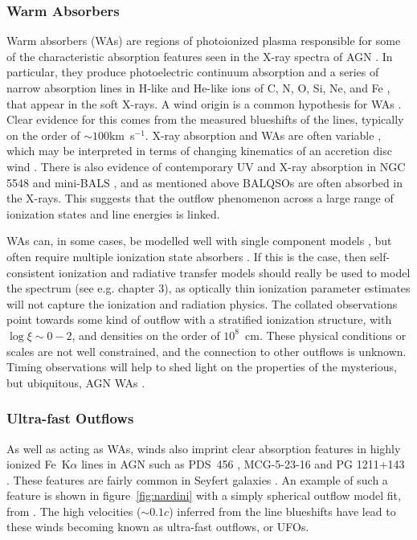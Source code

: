 \subsubsection{Warm Absorbers}

Warm absorbers (WAs) are regions of photoionized plasma responsible for some
of the characteristic absorption features seen in the 
X-ray spectra of AGN \citep{reynolds1995}.
In particular, they produce photoelectric continuum absorption 
\citep[e.g.][]{halpern1984,cappi1996,kriss1996}
and a series of narrow absorption lines in H-like and He-like ions of 
C, N, O, Si, Ne, and Fe \citep{kaastra2000}, that appear in the soft X-rays.
A wind origin is a common hypothesis for WAs 
\citep[e.g.][]{krolikkriss2001}. Clear evidence for this 
comes from the measured blueshifts of the lines, typically on the order of 
$\sim100$km~s$^{-1}$. X-ray absorption and WAs are often
variable \citep{fabian1994,otani1996}, which may be interpreted in terms of 
changing kinematics of an accretion disc wind \citep{connolly2014}. 
There is also evidence of contemporary UV and X-ray absorption 
in NGC 5548 \citep{kaastra2014} and mini-BALS \citep{giustini2011},
and as mentioned above BALQSOs 
are often absorbed in the X-rays. This suggests that the outflow phenomenon 
across a large range of ionization states and line energies is linked. 

WAs can, in some cases, be modelled well with single component 
models \citep{kaastra2000}, but often
require multiple ionization state absorbers 
\citep[e.g.][]{kriss1996,orr1997,krolikkriss2001,connolly2014}.
If this is the case, then self-consistent ionization and radiative transfer models
should really be used to model the spectrum (see e.g. chapter 3), 
as optically thin ionization parameter estimates will not capture 
the ionization and radiation physics.
The collated observations point towards some kind of outflow with a stratified ionization
structure, with $\log \xi \sim 0-2$, and densities on the order of $10^8$~cm. 
These physical conditions or scales are not well constrained, and the connection to 
other outflows is unknown. Timing observations will help to shed light on 
the properties of the mysterious, but ubiquitous, 
AGN WAs \citep{silva2015}.

\subsubsection{Ultra-fast Outflows}
\label{sec:ufos}

As well as acting as WAs, winds also imprint clear absorption features
in highly ionized Fe~K$\alpha$ lines in AGN such as PDS~456 
\citep{reeves2003, gofford2014,matzeu2016},
MCG-5-23-16 \citep{braito2007} and PG 1211+143 \citep{poundsreeves2009,fukumura2015}.
These features are fairly common in Seyfert galaxies \citep{tombesi2010a, gofford2013}. 
An example of such a feature is shown in 
figure~\ref{fig:nardini} with a simply spherical outflow model fit, 
from \citep{nardini2015}. The high velocities ($\sim0.1c$) inferred 
from the line blueshifts have lead to these winds becoming known as 
ultra-fast outflows, or UFOs. 

